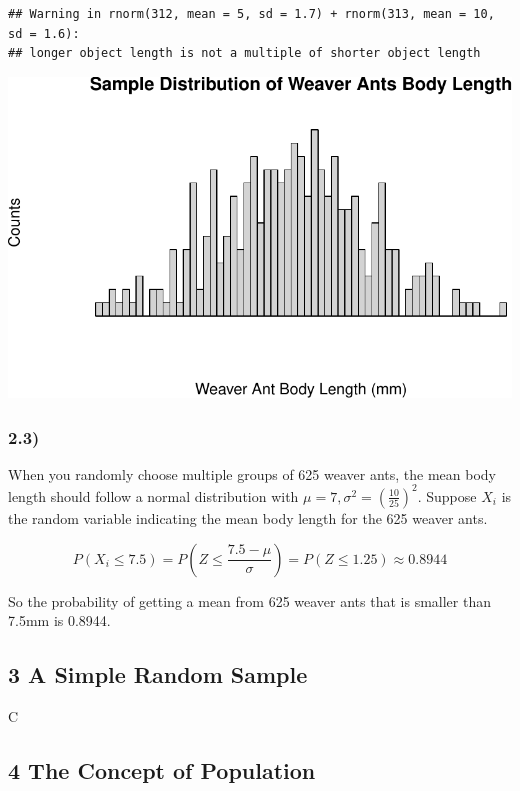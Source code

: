 \documentclass[
]{article}
\begin{document}
\begin{verbatim}
## Warning in rnorm(312, mean = 5, sd = 1.7) + rnorm(313, mean = 10, sd = 1.6):
## longer object length is not a multiple of shorter object length
\end{verbatim}

\begin{center}\includegraphics{hw4_files/figure-latex/unnamed-chunk-4-1} \end{center}

\hypertarget{section-5}{%
\subsubsection{2.3)}\label{section-5}}

When you randomly choose multiple groups of 625 weaver ants, the mean
body length should follow a normal distribution with
\(\mu = 7, \sigma^2 = (\frac{10}{25})^2\). Suppose \(X_i\) is the random
variable indicating the mean body length for the 625 weaver ants.

\[
P(X_i \leq 7.5) = P(Z \leq \frac{7.5 - \mu}{\sigma}) = P(Z \leq 1.25) \approx 0.8944
\]

So the probability of getting a mean from 625 weaver ants that is
smaller than 7.5mm is 0.8944.

\hypertarget{a-simple-random-sample}{%
\subsection{3 A Simple Random Sample}\label{a-simple-random-sample}}

C

\hypertarget{the-concept-of-population}{%
\subsection{4 The Concept of
Population}\label{the-concept-of-population}}
\end{document}
